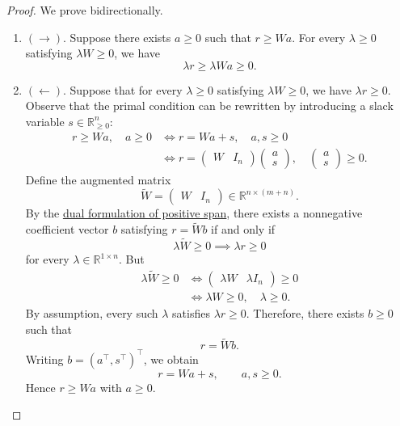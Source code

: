 	\begin{proof}
		We prove bidirectionally.
		\begin{enumerate}
			\item $(\rightarrow)$. Suppose there exists $a \geq 0$ such that $r \geq Wa$. For every $\lambda \geq 0$ satisfying $\lambda W \geq 0$, we have
				\begin{equation}
					\lambda r \geq \lambda Wa \geq 0.
				\end{equation}

			\item $(\leftarrow)$. Suppose that for every $\lambda \geq 0$ satisfying $\lambda W \geq 0$, we have $\lambda r \geq 0$. Observe that the primal condition can be rewritten by introducing a slack variable
				$s \in \mathbb{R}^n_{\geq 0}$:
				\begin{align}
					r \geq Wa,\quad a \geq 0
					&\iff r = Wa + s,\quad a,s \geq 0 \\
					&\iff
					r = \begin{pmatrix} W & I_n \end{pmatrix}
					\begin{pmatrix} a \\ s \end{pmatrix},
					\quad
					\begin{pmatrix} a \\ s \end{pmatrix} \geq 0.
				\end{align}
				Define the augmented matrix
				\begin{equation}
					\widetilde{W}
					= \begin{pmatrix} W & I_n \end{pmatrix}
					\in \mathbb{R}^{n \times (m+n)}.
				\end{equation}
				By the \hyperref[thm:dual-formulation-of-positive-span]{dual formulation of positive span}, there exists a nonnegative coefficient vector $b$ satisfying $r = \widetilde{W}b$ if and only if
				\begin{equation}
					\lambda \widetilde{W} \geq 0 \implies \lambda r \geq 0
				\end{equation}
				for every $\lambda \in \mathbb{R}^{1 \times n}$. But
				\begin{align}
					\lambda \widetilde{W} \geq 0
					&\iff
					\begin{pmatrix}
						\lambda W & \lambda I_n
					\end{pmatrix} \geq 0 \\
					&\iff \lambda W \geq 0,\quad \lambda \geq 0.
				\end{align}
				By assumption, every such $\lambda$ satisfies $\lambda r \geq 0$. Therefore, there exists $b \geq 0$ such that
				\begin{equation}
					r = \widetilde{W}b.
				\end{equation}
				Writing $b = (a^\top,s^\top)^\top$, we obtain
				\begin{equation}
					r = Wa + s,\qquad a,s \geq 0.
				\end{equation}
				Hence $r \geq Wa$ with $a \geq 0$. 
		\end{enumerate}
	\end{proof}

